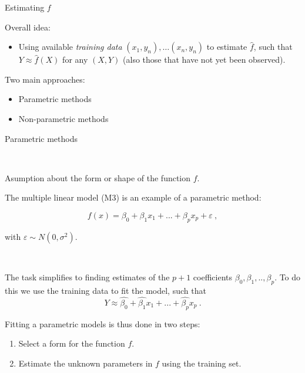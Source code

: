 \documentclass[ignorenonframetext,]{beamer}
\providecommand{\tightlist}{%
  \setlength{\itemsep}{0pt}\setlength{\parskip}{0pt}}
\begin{document}
\begin{frame}{Estimating \(f\)}

Overall idea:

\begin{itemize}
\tightlist
\item
  Using available \emph{training data} \((x_1,y_n),\ldots (x_n,y_n)\) to
  estimate \(\hat{f}\), such that \(Y\approx \hat{f}(X)\) for any
  \((X,Y)\) (also those that have not yet been observed).
\end{itemize}

Two main approaches:

\begin{itemize}
\tightlist
\item
  Parametric methods
\item
  Non-parametric methods
\end{itemize}

\end{frame}

\begin{frame}

\begin{block}{Parametric methods}

\(~\)

Asumption about the form or shape of the function \(f\).

The multiple linear model (M3) is an example of a parametric method:

\[f(x) = \beta_0 + \beta_1 x_1 + ... + \beta_p x_p+\varepsilon \ , \]

with \(\varepsilon \sim N(0,\sigma^2)\).

\(~\)

The task simplifies to finding estimates of the \(p+1\) coefficients
\(\beta_0, \beta_1, .. ,\beta_p\). To do this we use the training data
to fit the model, such that
\[Y \approx \hat{\beta_0} + \hat{\beta_1} x_1 + ... + \hat{\beta_p} x_p \ .\]

\end{block}

\end{frame}

\begin{frame}

Fitting a parametric models is thus done in two steps:

\begin{enumerate}
\def\labelenumi{\arabic{enumi}.}
\tightlist
\item
  Select a form for the function \(f\).\\
\item
  Estimate the unknown parameters in \(f\) using the training set.
\end{enumerate}

\end{frame}
\end{document}

